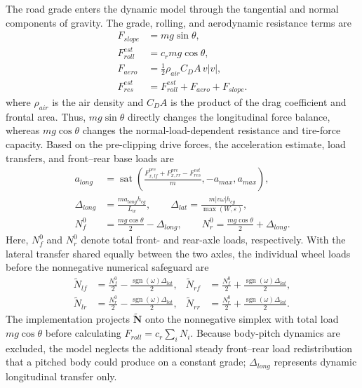 \documentclass{ieeeaccess}
\begin{document}
The road grade enters the dynamic model through the tangential and normal components of gravity. The grade, rolling, and aerodynamic resistance terms are
\begin{equation}
\begin{aligned}
F_{slope}&=mg\sin\theta,\\
F_{roll}^{est}&=c_rmg\cos\theta,\\
F_{aero}&=\frac{1}{2}\rho_{air}C_DA\,v|v|,\\
F_{res}^{est}&=F_{roll}^{est}+F_{aero}+F_{slope}.
\end{aligned}
\label{eq:agv_slope_resistance}
\end{equation}
where $\rho_{air}$ is the air density and $C_DA$ is the product of the drag coefficient and frontal area. Thus, $mg\sin\theta$ directly changes the longitudinal force balance, whereas $mg\cos\theta$ changes the normal-load-dependent resistance and tire-force capacity. Based on the pre-clipping drive forces, the acceleration estimate, load transfers, and front--rear base loads are
\begin{equation}
\begin{aligned}
a_{long}&=\operatorname{sat}\!\left(
\frac{F_{x,lf}^{pre}+F_{x,rr}^{pre}-F_{res}^{est}}{m},-a_{max},a_{max}\right),\\
\Delta_{long}&=\frac{ma_{long}h_{cg}}{L_w},\qquad
\Delta_{lat}=\frac{m|v\omega|h_{cg}}{\max(W,\varepsilon)},\\
N_f^0&=\frac{mg\cos\theta}{2}-\Delta_{long},\qquad
N_r^0=\frac{mg\cos\theta}{2}+\Delta_{long}.
\end{aligned}
\label{eq:agv_load_transfer}
\end{equation}
Here, $N_f^0$ and $N_r^0$ denote total front- and rear-axle loads, respectively. With the lateral transfer shared equally between the two axles, the individual wheel loads before the nonnegative numerical safeguard are
\begin{equation}
\begin{aligned}
\widetilde N_{lf}&=\frac{N_f^0}{2}-\frac{\operatorname{sgn}(\omega)\Delta_{lat}}{2},&
\widetilde N_{rf}&=\frac{N_f^0}{2}+\frac{\operatorname{sgn}(\omega)\Delta_{lat}}{2},\\
\widetilde N_{lr}&=\frac{N_r^0}{2}-\frac{\operatorname{sgn}(\omega)\Delta_{lat}}{2},&
\widetilde N_{rr}&=\frac{N_r^0}{2}+\frac{\operatorname{sgn}(\omega)\Delta_{lat}}{2}.
\end{aligned}
\label{eq:agv_wheel_load_distribution}
\end{equation}
The implementation projects $\widetilde{\bm N}$ onto the nonnegative simplex with total load $mg\cos\theta$ before calculating $F_{roll}=c_r\sum_iN_i$. Because body-pitch dynamics are excluded, the model neglects the additional steady front--rear load redistribution that a pitched body could produce on a constant grade; $\Delta_{long}$ represents dynamic longitudinal transfer only.
\end{document}
